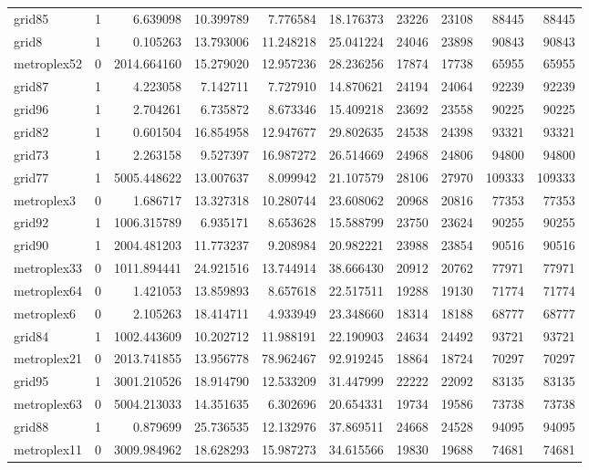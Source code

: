 \begin{longtable}{|l|r|r|r|r|r|r|r|r|r|}
grid85 & 1 & 6.639098 & 10.399789 & 7.776584 & 18.176373 & 23226 & 23108 & 88445 & 88445 \\
grid8 & 1 & 0.105263 & 13.793006 & 11.248218 & 25.041224 & 24046 & 23898 & 90843 & 90843 \\
metroplex52 & 0 & 2014.664160 & 15.279020 & 12.957236 & 28.236256 & 17874 & 17738 & 65955 & 65955 \\
grid87 & 1 & 4.223058 & 7.142711 & 7.727910 & 14.870621 & 24194 & 24064 & 92239 & 92239 \\
grid96 & 1 & 2.704261 & 6.735872 & 8.673346 & 15.409218 & 23692 & 23558 & 90225 & 90225 \\
grid82 & 1 & 0.601504 & 16.854958 & 12.947677 & 29.802635 & 24538 & 24398 & 93321 & 93321 \\
grid73 & 1 & 2.263158 & 9.527397 & 16.987272 & 26.514669 & 24968 & 24806 & 94800 & 94800 \\
grid77 & 1 & 5005.448622 & 13.007637 & 8.099942 & 21.107579 & 28106 & 27970 & 109333 & 109333 \\
metroplex3 & 0 & 1.686717 & 13.327318 & 10.280744 & 23.608062 & 20968 & 20816 & 77353 & 77353 \\
grid92 & 1 & 1006.315789 & 6.935171 & 8.653628 & 15.588799 & 23750 & 23624 & 90255 & 90255 \\
grid90 & 1 & 2004.481203 & 11.773237 & 9.208984 & 20.982221 & 23988 & 23854 & 90516 & 90516 \\
metroplex33 & 0 & 1011.894441 & 24.921516 & 13.744914 & 38.666430 & 20912 & 20762 & 77971 & 77971 \\
metroplex64 & 0 & 1.421053 & 13.859893 & 8.657618 & 22.517511 & 19288 & 19130 & 71774 & 71774 \\
metroplex6 & 0 & 2.105263 & 18.414711 & 4.933949 & 23.348660 & 18314 & 18188 & 68777 & 68777 \\
grid84 & 1 & 1002.443609 & 10.202712 & 11.988191 & 22.190903 & 24634 & 24492 & 93721 & 93721 \\
metroplex21 & 0 & 2013.741855 & 13.956778 & 78.962467 & 92.919245 & 18864 & 18724 & 70297 & 70297 \\
grid95 & 1 & 3001.210526 & 18.914790 & 12.533209 & 31.447999 & 22222 & 22092 & 83135 & 83135 \\
metroplex63 & 0 & 5004.213033 & 14.351635 & 6.302696 & 20.654331 & 19734 & 19586 & 73738 & 73738 \\
grid88 & 1 & 0.879699 & 25.736535 & 12.132976 & 37.869511 & 24668 & 24528 & 94095 & 94095 \\
metroplex11 & 0 & 3009.984962 & 18.628293 & 15.987273 & 34.615566 & 19830 & 19688 & 74681 & 74681 \\

\end{longtable}
